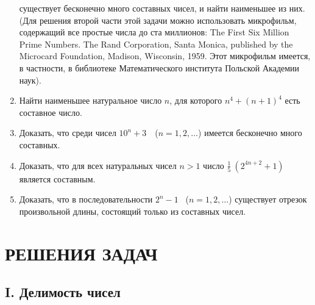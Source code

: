 \documentclass[12pt, a4paper, openany]{book}
\begin{document}
\begin{enumerate}
	существует бесконечно много составных чисел, и найти наименьшее из них. (Для решения второй части этой задачи можно использовать микрофильм, содержащий все простые числа до ста миллионов: The First Six Million Prime Numbers. The Rand Corporation, Santa Monica, published by the Microcard Foundation, Madison, Wisconsin, 1959. Этот микрофильм имеется, в частности, в библиотеке Математического института Польской Академии наук).
	\item Найти наименьшее натуральное число $n$, для которого $n^4+(n+1)^4$ есть составное число.
	\item Доказать, что среди чисел $10^n+3$\ \ ($n=1,2,\dots$) имеется бесконечно много составных.
	\item Доказать, что для всех натуральных чисел $n>1$ число $\displaystyle\frac{1}{5}\ (2^{4n+2}+1)$ является составным.
	\item Доказать, что в последовательности $2^n-1$ \ ($n=1,2, \dots$) существует отрезок произвольной длины, состоящий только из составных чисел.
	
\end{enumerate}








































\newpage

\section[Решения задач]{\center РЕШЕНИЯ ЗАДАЧ}
\subsection[I. Делимость чисел]{\center I. Делимость чисел}
\end{document}
